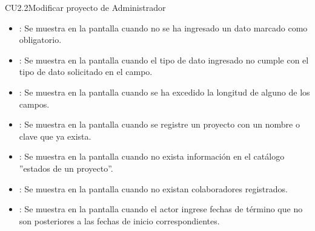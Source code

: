 \begin{UseCase}{CU2.2}{Modificar proyecto de Administrador}
{\begin{itemize}
		\item {}: Se muestra en la pantalla  cuando no se ha ingresado un dato marcado como obligatorio.
		\item {}: Se muestra en la pantalla  cuando el tipo de dato ingresado no cumple con el tipo de dato solicitado en
		el campo.
		\item {}: Se muestra en la pantalla  cuando se ha excedido la longitud de alguno de los campos.
		\item {}: Se muestra en la pantalla  cuando se registre un proyecto con un nombre o clave que ya exista.
		\item {}: Se muestra en la pantalla  cuando no exista información en el catálogo ''estados de un proyecto''.
		\item {}: Se muestra en la pantalla  cuando no existan colaboradores registrados.
		\item {}: Se muestra en la pantalla  cuando el actor ingrese fechas de término que no son posteriores a las fechas
		de inicio correspondientes.
		\end{itemize}
		}
	\end{UseCase}
